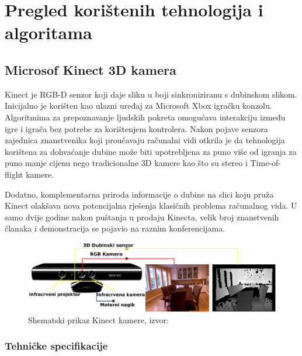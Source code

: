 \newpage
\setcounter{figure}{0}

\section{Pregled korištenih tehnologija i algoritama} %
\label{sec:Tehnologija i teorija}


\subsection{Microsof Kinect 3D kamera} %
\label{sub:Microsof Kinect 3D kamera}

Kinect je RGB-D senzor koji daje sliku u boji sinkroniziranu s dubinskom
slikom. Inicijalno je korišten kao ulazni uređaj za Microsoft Xbox
igračku konzolu. Algoritmima za prepoznavanje ljudskih pokreta omogućava
interakciju između igre i igrača bez potrebe za korištenjem kontrolera.
Nakon pojave senzora zajednica znanstvenika koji proučavaju računalni
vidi otkrila je da tehnologija korištena za dohvaćanje dubine može biti
upotrebljena za puno više od igranja za puno manje cijenu nego
tradicionalne 3D kamere kao što su stereo i Time-of-flight kamere.

Dodatno, komplementarna priroda informacije o dubine na slici koju pruža
Kinect olakšava nova potencijalna rješenja klasičnih problema računalnog
vida. U samo dvije godine nakon puštanja u prodaju Kinecta, velik broj
znanstvenih članaka i demonstracija se pojavio na raznim konferencijama.

\begin{figure}[h]
\centering
\includegraphics[scale=0.15]{figures/kinect.png}
\caption{Shematski prikaz Kinect kamere, izvor:~\cite{HanSXS13}}
\label{fig:kinect.png}
\end{figure}

\subsubsection{Tehničke specifikacije} %
\label{ssub:Tehničke specifikacije}

